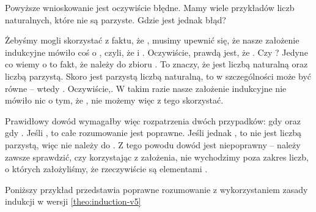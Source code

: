Powyższe wnioskowanie jest oczywiście błędne. Mamy wiele przykładów liczb naturalnych, które nie są parzyste. Gdzie jest jednak błąd? 

Żebyśmy mogli skorzystać z faktu, że , musimy upewnić się, że nasze założenie indukcyjne mówiło coś o , czyli, że  i  . Oczywiście, prawdą jest, że . Czy ? Jedyne co wiemy o  to fakt, że należy do zbioru . To znaczy, że jest liczbą naturalną oraz liczbą parzystą. Skoro  jest parzystą liczbą naturalną, to w szczególności może być równe  -- wtedy . Oczywiście,. W takim razie nasze założenie indukcyjne nie mówiło nic o tym, że , nie możemy więc z tego skorzystać.

Prawidłowy dowód wymagałby więc rozpatrzenia dwóch przypadków: gdy  oraz gdy . Jeśli , to całe rozumowanie jest poprawne. Jeśli jednak , to  nie jest liczbą parzystą, więc nie należy do . Z tego powodu dowód jest niepoprawny -- należy zawsze sprawdzić, czy korzystając z założenia, nie wychodzimy poza zakres liczb, o których założyliśmy, że rzeczywiście są elementami .

Poniższy przykład przedstawia poprawne rozumowanie z wykorzystaniem zasady indukcji w wersji \ref{theo:induction-v5}

